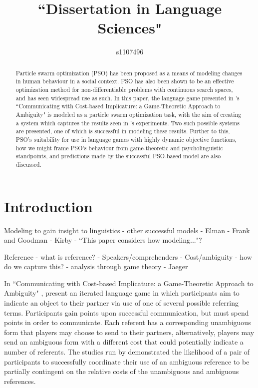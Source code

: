 \documentclass[12pt]{article}
\begin{document}
\title{``Dissertation in Language Sciences"}
\author{s1107496}

\maketitle

\begin{abstract}
Particle swarm optimization (PSO) has been proposed as a means of modeling changes in human behaviour in a social context. PSO has also been shown to be an effective optimization method for non-differentiable problems with continuous search spaces, and has seen widespread use as such. In this paper, the language game presented in \citeauthor{rohde2012}'s ``Communicating with Cost-based Implicature: a Game-Theoretic Approach to Ambiguity" is modeled as a particle swarm optimization task, with the aim of creating a system which captures the results seen in \citeauthor{rohde2012}'s experiments. Two such possible systems are presented, one of which is successful in modeling these results. Further to this, PSO's suitability for use in language games with highly dynamic objective functions, how we might frame PSO's behaviour from game-theoretic and psycholinguistic standpoints, and predictions made by the successful PSO-based model are also discussed.
\end{abstract}



\section{Introduction}
Modeling to gain insight to linguistics - other successful models - Elman - Frank and Goodman - Kirby - ``This paper considers how modeling..."?

Reference - what is reference? - Speakers/comprehenders - Cost/ambiguity - how do we capture this? - analysis through game theory - Jaeger

In ``Communicating with Cost-based Implicature: a Game-Theoretic Approach to Ambiguity" \citeyearpar{rohde2012}, \citeauthor{rohde2012} present an iterated language game in which participants aim to indicate an object to their partner via use of one of several possible referring terms. Participants gain points upon successful communication, but must spend points in order to communicate. Each referent has a corresponding unambiguous form that players may choose to send to
their partners, alternatively, players may send an ambiguous form with a different cost that could potentially indicate a number of referents. The studies run by \citeauthor{rohde2012} demonstrated the likelihood of a pair of participants to successfully coordinate their use of an ambiguous reference to be partially contingent on the relative costs of the unambiguous and ambiguous references.
\end{document}
